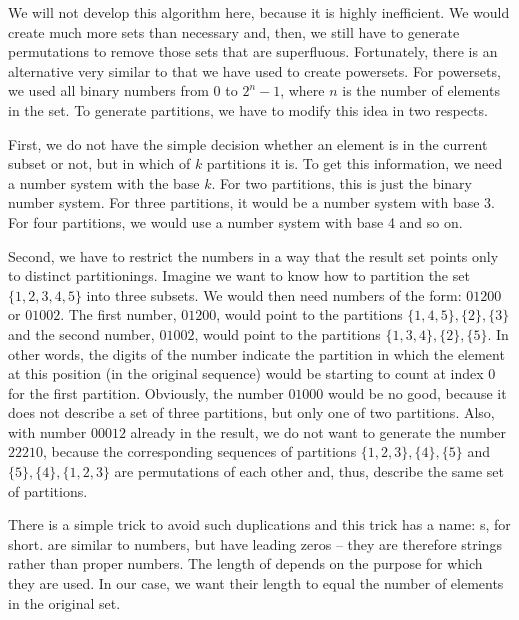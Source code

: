 \documentclass{scrreprt}
\begin{document}
We will not develop this algorithm here,
because it is highly inefficient.
We would create much more sets than necessary
and, then, we still have to generate permutations
to remove those sets that are superfluous.
Fortunately, there is an alternative
very similar to that we have used to create powersets.
For powersets, we used all binary numbers from 0 to $2^n-1$,
where $n$ is the number of elements in the set.
To generate partitions, we have to modify this idea
in two respects.

First, we do not have the simple decision
whether an element is in the current subset or not,
but in which of $k$ partitions it is.
To get this information, we need a number system
with the base $k$.
For two partitions, this is just the binary number system.
For three partitions, it would be a number system with base 3.
For four partitions, we would use a number system with base 4 
and so on.

Second, we have to restrict the numbers in a way
that the result set points only to distinct partitionings.
Imagine we want to know how to partition 
the set $\lbrace 1,2,3,4,5\rbrace$ into three subsets.
We would then need numbers of the form:
$01200$ or $01002$.
The first number, $01200$, would point to the partitions
$\lbrace 1,4,5\rbrace, \lbrace 2\rbrace, \lbrace 3\rbrace$ and
the second number, $01002$, would point to the partitions
$\lbrace 1,3,4\rbrace, \lbrace 2\rbrace, \lbrace 5\rbrace$.
In other words, the digits of the number indicate
the partition in which the element at this position
(in the original sequence) would be starting to count at
index 0 for the first partition.
Obviously, the number $01000$ would be no good,
because it does not describe a set of three partitions,
but only one of two partitions.
Also, with number $00012$ already in the result,
we do not want to generate the number $22210$,
because the corresponding sequences of partitions
$\lbrace 1,2,3\rbrace, \lbrace 4\rbrace, \lbrace 5\rbrace$ and
$\lbrace 5\rbrace, \lbrace 4\rbrace, \lbrace 1,2,3\rbrace$ 
are permutations of each other and, thus, describe 
the same set of partitions.

There is a simple trick to avoid such duplications
and this trick has a name: s,
 for short.
 are similar to numbers, but have leading zeros --
they are therefore strings rather than proper numbers.
The length of  depends on the purpose
for which they are used. In our case,
we want their length to equal the number of elements
in the original set.
\end{document}
